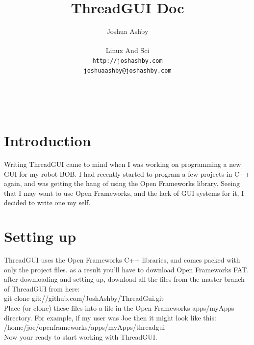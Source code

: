 \documentclass{article}
\begin{document}
\author{Joshua Ashby\\
\\
        Linux And Sci\\
                \texttt{http://joshashby.com}\\
		\texttt{joshuaashby@joshashby.com}}
\title{ThreadGUI Doc}

\maketitle

\tableofcontents
\newpage
{}\\
\section{Introduction}
Writing ThreadGUI came to mind when I was working on programming a new GUI for my robot BOB. I had recently started to program a few projects in C++ again, and was getting the hang of using the Open Frameworks library. Seeing that I may want to use Open Frameworks, and the lack of GUI systems for it, I decided to write one my self.\\
\section{Setting up}
ThreadGUI uses the Open Frameworks C++ libraries, and comes packed with only the project files. as a result you'll have to download Open Frameworks FAT. after downloading and setting up, download all the files from the master branch of ThreadGUI from here:\\
git clone git://github.com/JoshAshby/ThreadGui.git\\
Place (or clone) these files into a file in the Open Frameworks apps/myApps directory. For example, if my user was Joe then it might look like this:\\
/home/joe/openframeworks/apps/myApps/threadgui\\
Now your ready to start working with ThreadGUI.\\
\end{document}
